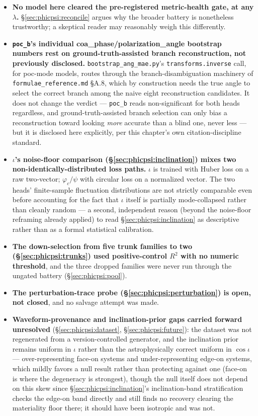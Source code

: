 \begin{itemize}
\item \textbf{No model here cleared the pre-registered metric-health gate, at any $\lambda$.}
\S\ref{sec:phicpsi:reconcile} argues why the broader battery is nonetheless trustworthy; a skeptical reader may reasonably weigh this differently.
\item \textbf{\texttt{poc\_b}'s individual coa\_phase/polarization\_angle bootstrap numbers rest on ground-truth-assisted branch reconstruction, not previously disclosed.}
\texttt{bootstrap\_ang\_mae.py}'s \texttt{transforms.inverse} call, for poc-mode models, routes through the branch-disambiguation machinery of \texttt{formulae\_reference.md} \S A.8, which by construction needs the true angle to select the correct branch among the naive eight reconstruction candidates.
It does not change the verdict --- \texttt{poc\_b} reads non-significant for both heads regardless, and ground-truth-assisted branch selection can only bias a reconstruction toward looking \emph{more} accurate than a blind one, never less --- but it is disclosed here explicitly, per this chapter's own citation-discipline standard.
\item \textbf{$\iota$'s noise-floor comparison (\S\ref{sec:phicpsi:inclination}) mixes two non-identically-distributed loss paths.}
$\iota$ is trained with Huber loss on a raw two-vector; $\varphi_c/\psi$ with circular loss on a normalized vector.
The two heads' finite-sample fluctuation distributions are not strictly comparable even before accounting for the fact that $\iota$ itself is partially mode-collapsed rather than cleanly random --- a second, independent reason (beyond the noise-floor reframing already applied) to read \S\ref{sec:phicpsi:inclination} as descriptive rather than as a formal statistical calibration.
\item \textbf{The down-selection from five trunk families to two (\S\ref{sec:phicpsi:trunks}) used positive-control $R^2$ with no numeric threshold}, and the three dropped families were never run through the ungated battery (\S\ref{sec:phicpsi:pool}).
\item \textbf{The perturbation-trace probe (\S\ref{sec:phicpsi:perturbation}) is open, not closed}, and no salvage attempt was made.
\item \textbf{Waveform-provenance and inclination-prior gaps carried forward unresolved} (\S\ref{sec:phicpsi:dataset}, \S\ref{sec:phicpsi:future}): the dataset was not regenerated from a version-controlled generator, and the inclination prior remains uniform in $\iota$ rather than the astrophysically correct uniform in $\cos\iota$ --- over-representing face-on systems and under-representing edge-on systems, which mildly favors a null result rather than protecting against one (face-on is where the degeneracy is strongest), though the null itself does not depend on this skew since \S\ref{sec:phicpsi:inclination}'s inclination-band stratification checks the edge-on band directly and still finds no recovery clearing the materiality floor there; it should have been isotropic and was not.

\end{itemize}
